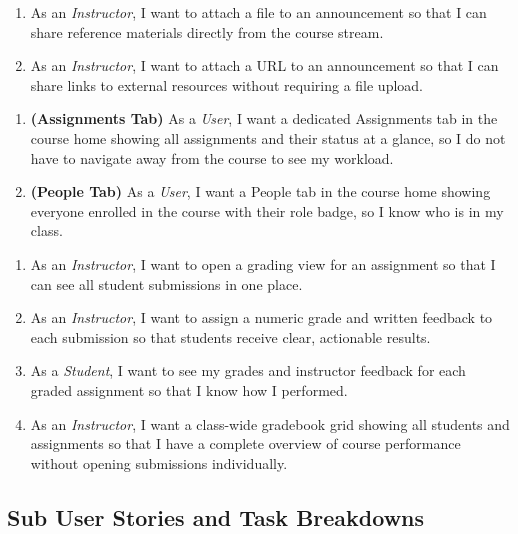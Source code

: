 \documentclass[12pt, a4paper]{article}
\begin{document}
\begin{enumerate}[label=\textbf{US\,\arabic*}, start=12]
  \item As an \emph{Instructor}, I want to attach a file to an announcement so that I can share reference materials directly from the course stream.
  \item As an \emph{Instructor}, I want to attach a URL to an announcement so that I can share links to external resources without requiring a file upload.
\end{enumerate}

\begin{enumerate}[label=\textbf{US\,\arabic*}, start=15]
  \item \textbf{(Assignments Tab)} As a \emph{User}, I want a dedicated Assignments tab in the course home showing all assignments and their status at a glance, so I do not have to navigate away from the course to see my workload.
  \item \textbf{(People Tab)} As a \emph{User}, I want a People tab in the course home showing everyone enrolled in the course with their role badge, so I know who is in my class.
\end{enumerate}

\begin{enumerate}[label=\textbf{US\,\arabic*}, start=19]
  \item As an \emph{Instructor}, I want to open a grading view for an assignment so that I can see all student submissions in one place.
  \item As an \emph{Instructor}, I want to assign a numeric grade and written feedback to each submission so that students receive clear, actionable results.
  \item As a \emph{Student}, I want to see my grades and instructor feedback for each graded assignment so that I know how I performed.
  \item As an \emph{Instructor}, I want a class-wide gradebook grid showing all students and assignments so that I have a complete overview of course performance without opening submissions individually.
\end{enumerate}

\subsection{Sub User Stories and Task Breakdowns}
\end{document}
